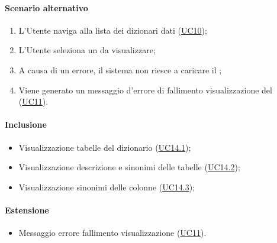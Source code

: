 \paragraph*{Scenario alternativo}
\begin{enumerate}
  \item L’Utente naviga alla lista dei dizionari dati (\hyperref[UC10]{UC10});
  \item L'Utente seleziona un  da visualizzare;
  \item A causa di un errore, il sistema non riesce a caricare il ;
  \item Viene generato un messaggio d'errore di fallimento visualizzazione del  (\hyperref[UC11]{UC11}).
\end{enumerate}

\paragraph*{Inclusione}
\begin{itemize}
  \item Visualizzazione tabelle del dizionario (\hyperref[UC14point1]{UC14.1});
  \item Visualizzazione descrizione e sinonimi delle tabelle (\hyperref[UC14point2]{UC14.2});
  \item Visualizzazione sinonimi delle colonne (\hyperref[UC14point3]{UC14.3});
\end{itemize}

\paragraph*{Estensione}
\begin{itemize}
  \item Messaggio errore fallimento visualizzazione  (\hyperref[UC11]{UC11}).
\end{itemize}


